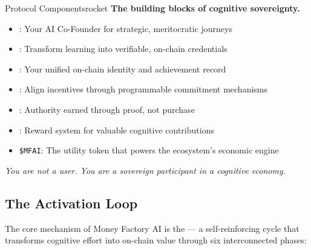 \begin{mfai-box}{Protocol Components}{rocket}
\faRocket\quad \textbf{The building blocks of cognitive sovereignty.}

\begin{itemize}
    \item \faBrain\quad {}: Your AI Co-Founder for strategic, meritocratic journeys
    \item \faGraduationCap\quad {}: Transform learning into verifiable, on-chain credentials
    \item \faCertificate\quad {}: Your unified on-chain identity and achievement record
    \item \faLock\quad {}: Align incentives through programmable commitment mechanisms
    \item \faNetworkWired\quad {}: Authority earned through proof, not purchase
    \item \faCoins\quad {}: Reward system for valuable cognitive contributions
    \item \faCode\quad \texttt{\$MFAI}: The utility token that powers the ecosystem's economic engine
\end{itemize}
\vspace{0.5em}
\textit{You are not a user. You are a sovereign participant in a cognitive economy.}
\end{mfai-box}

\subsection*{The Activation Loop\texttrademark}

The core mechanism of Money Factory AI is the  — a self-reinforcing cycle that transforms cognitive effort into on-chain value through six interconnected phases:

